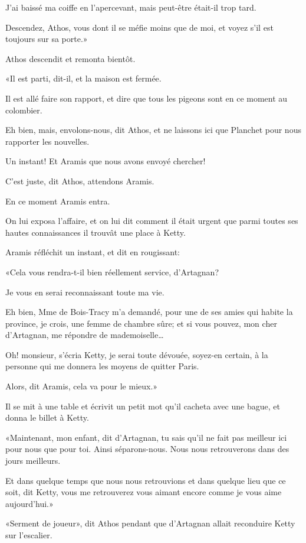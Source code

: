 \speak  J'ai baissé ma coiffe en l'apercevant, mais peut-être était-il trop tard. 

\speak  Descendez, Athos, vous dont il se méfie moins que de moi, et voyez s'il est toujours sur sa porte.» 

Athos descendit et remonta bientôt. 

«Il est parti, dit-il, et la maison est fermée. 

\speak  Il est allé faire son rapport, et dire que tous les pigeons sont en ce moment au colombier. 

\speak  Eh bien, mais, envolons-nous, dit Athos, et ne laissons ici que Planchet pour nous rapporter les nouvelles. 

\speak  Un instant! Et Aramis que nous avons envoyé chercher! 

\speak  C'est juste, dit Athos, attendons Aramis. 

En ce moment Aramis entra. 

On lui exposa l'affaire, et on lui dit comment il était urgent que parmi toutes ses hautes connaissances il trouvât une place à Ketty. 

Aramis réfléchit un instant, et dit en rougissant: 

«Cela vous rendra-t-il bien réellement service, d'Artagnan? 

\speak  Je vous en serai reconnaissant toute ma vie. 

\speak  Eh bien, Mme de Bois-Tracy m'a demandé, pour une de ses amies qui habite la province, je crois, une femme de chambre sûre; et si vous pouvez, mon cher d'Artagnan, me répondre de mademoiselle\dots 

\speak  Oh! monsieur, s'écria Ketty, je serai toute dévouée, soyez-en certain, à la personne qui me donnera les moyens de quitter Paris. 

\speak  Alors, dit Aramis, cela va pour le mieux.» 

Il se mit à une table et écrivit un petit mot qu'il cacheta avec une bague, et donna le billet à Ketty. 

«Maintenant, mon enfant, dit d'Artagnan, tu sais qu'il ne fait pas meilleur ici pour nous que pour toi. Ainsi séparons-nous. Nous nous retrouverons dans des jours meilleurs. 

\speak  Et dans quelque temps que nous nous retrouvions et dans quelque lieu que ce soit, dit Ketty, vous me retrouverez vous aimant encore comme je vous aime aujourd'hui.» 

«Serment de joueur», dit Athos pendant que d'Artagnan allait reconduire Ketty sur l'escalier. 

